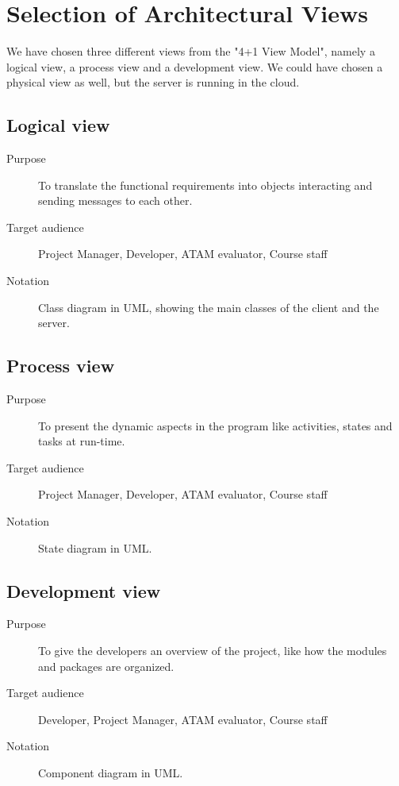 \section{Selection of Architectural Views}
We have chosen three different views from the "4+1 View Model", namely a logical view, a process view and a development view. We could have chosen a physical view as well, but the server is running in the cloud.

\subsection{Logical view}
\begin{description}
\item[Purpose] 
To translate the functional requirements into objects interacting and sending messages to each other. 

\item[Target audience]
Project Manager, Developer, ATAM evaluator, Course staff

\item[Notation]
Class diagram in UML, showing the main classes of the client and the server. 

\end{description}

\subsection{Process view}
\begin{description}
\item[Purpose] 
To present the dynamic aspects in the program like activities, states and tasks at run-time. 

\item[Target audience]
Project Manager, Developer, ATAM evaluator, Course staff

\item[Notation]
State diagram in UML.
\end{description}


\subsection{Development view}
\begin{description}
\item[Purpose] 
To give the developers an overview of the project, like how the modules and packages are organized. 

\item[Target audience]
Developer, Project Manager, ATAM evaluator, Course staff

\item[Notation]
Component diagram in UML.

\end{description}
